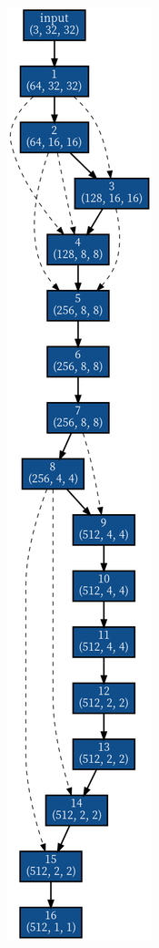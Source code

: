\documentclass[twocolumn]{jarticle}     %
\begin{document}
\begin{figure}[tb]
 \begin{minipage}{0.5\hsize}
 	\begin{center}
 		\includegraphics[clip,scale=0.25]{graph_g1.png}

\end{center}
\end{minipage}
\end{figure}
\end{document}
